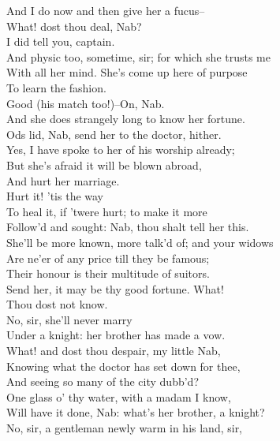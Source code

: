 \documentclass{memoir}
\begin{document}
\begin{drama*}
\druggerspeaks  And I do now and then give her a fucus--\\
\facespeaks  What! dost thou deal, Nab?\\
\subtlespeaks {} I did tell you, captain.\\
\druggerspeaks  And physic too, sometime, sir; for which she trusts me\\
 With all her mind. She's come up here of purpose\\
 To learn the fashion.\\
\facespeaks {} Good (his match too!)--On, Nab.\\
\druggerspeaks  And she does strangely long to know her fortune.\\
\facespeaks  Ods lid, Nab, send her to the doctor, hither.\\
\druggerspeaks  Yes, I have spoke to her of his worship already;\\
 But she's afraid it will be blown abroad,\\
 And hurt her marriage.\\
\facespeaks {} Hurt it! 'tis the way\\
 To heal it, if 'twere hurt; to make it more\\
 Follow'd and sought: Nab, thou shalt tell her this.\\
 She'll be more known, more talk'd of; and your widows\\
 Are ne'er of any price till they be famous;\\
 Their honour is their multitude of suitors.\\
 Send her, it may be thy good fortune. What!\\
 Thou dost not know.\\
\druggerspeaks {} No, sir, she'll never marry\\
 Under a knight: her brother has made a vow.\\
\facespeaks  What! and dost thou despair, my little Nab,\\
 Knowing what the doctor has set down for thee,\\
 And seeing so many of the city dubb'd?\\
 One glass o' thy water, with a madam I know,\\
 Will have it done, Nab: what's her brother, a knight?\\
\druggerspeaks  No, sir, a gentleman newly warm in his land, sir,\\

\end{drama*}
\end{document}
